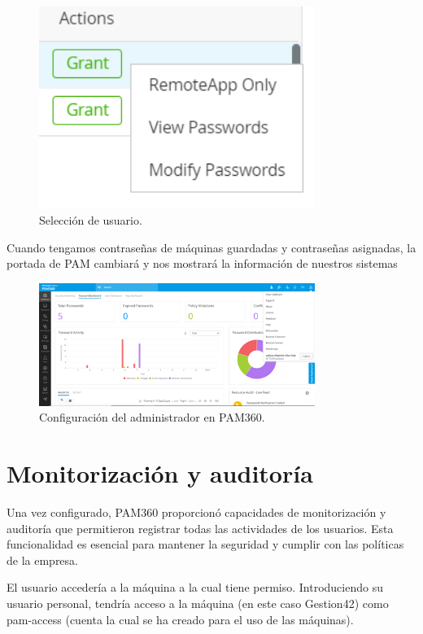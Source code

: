 \begin{figure}[H]
	\centering
	\includegraphics[width=0.8\textwidth]{./img/share-detail.png}
	\caption{Selección de usuario.}
	\label{fig:share_detail}
\end{figure}


Cuando tengamos contraseñas de máquinas guardadas y contraseñas asignadas, la portada de PAM cambiará y nos mostrará la información de nuestros sistemas

\begin{figure}[H]
	\centering
	\includegraphics[width=0.8\textwidth]{./img/pam_portada_contodo.png}
	\caption{Configuración del administrador en PAM360.}
	\label{fig:pam_portadaactualizada}
\end{figure}

\section{Monitorización y auditoría}
Una vez configurado, PAM360 proporcionó capacidades de monitorización y auditoría que permitieron registrar todas las actividades de los usuarios. Esta funcionalidad es esencial para mantener la seguridad y cumplir con las políticas de la empresa.

El usuario accedería a la máquina a la cual tiene permiso. Introduciendo su usuario personal, tendría acceso a la máquina (en este caso Gestion42) como pam-access (cuenta la cual se ha creado para el uso de las máquinas). 

